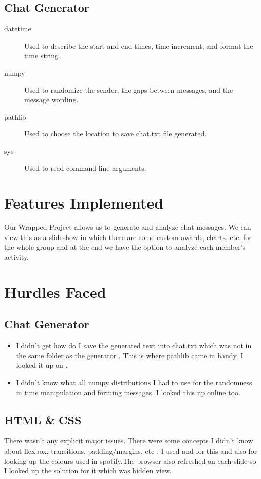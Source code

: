 \documentclass{report}
\begin{document}
\subsection{Chat Generator}
\begin{description}
  \item[datetime] Used to describe the start and end times, time increment, and format the time string.
  \item[numpy] Used to randomize the sender, the gaps between messages, and the message wording.
  \item[pathlib] Used to choose the location to save chat.txt file generated.
  \item[sys] Used to read command line arguments.
\end{description}

\section{Features Implemented}
Our Wrapped Project allows us to generate and analyze chat messages. We can view this as a slideshow in which there are some custom awards, charts, etc. for the whole group and at the end we have the option to analyze each member's activity.

\section{Hurdles Faced}
\subsection{Chat Generator}
\begin{itemize}
    \item I didn't get how do I save the generated text into chat.txt which was not in the same folder as the generator . This is where pathlib came in handy. I looked it up on \cite{pythondocs}.
    \item I didn't know what all numpy distributions I had to use for the randomness in time manipulation and forming messages. I looked this up online too.
\end{itemize}
\subsection{HTML \& CSS}
There wasn't any explicit major issues. There were some concepts I didn't know about flexbox, transitions, padding/margins, etc . I used \cite{gemini} and \cite{w3schools} for this and also for looking up the colours used in spotify.The browser also refreshed on each slide so I looked up the solution for it which was hidden view.
\end{document}
